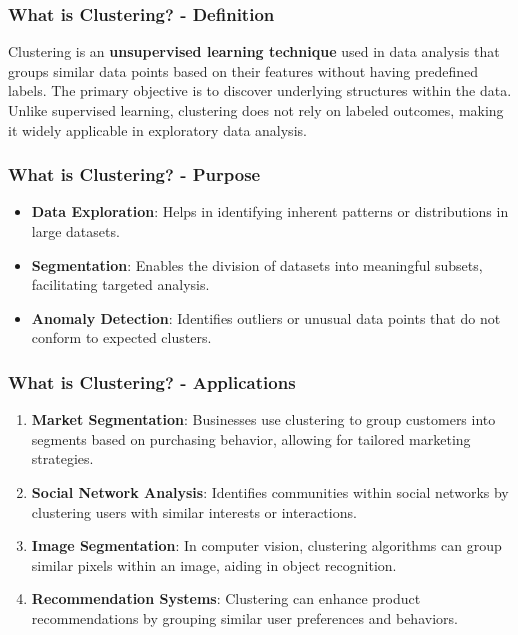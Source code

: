 \documentclass[aspectratio=169]{beamer}
\begin{document}
\begin{frame}[fragile]
    \frametitle{What is Clustering? - Definition}
    Clustering is an \textbf{unsupervised learning technique} used in data analysis that groups similar data points based on their features without having predefined labels. 
    The primary objective is to discover underlying structures within the data. Unlike supervised learning, clustering does not rely on labeled outcomes, making it widely applicable in exploratory data analysis.
\end{frame}

\begin{frame}[fragile]
    \frametitle{What is Clustering? - Purpose}
    \begin{itemize}
        \item \textbf{Data Exploration}: Helps in identifying inherent patterns or distributions in large datasets.
        \item \textbf{Segmentation}: Enables the division of datasets into meaningful subsets, facilitating targeted analysis.
        \item \textbf{Anomaly Detection}: Identifies outliers or unusual data points that do not conform to expected clusters.
    \end{itemize}
\end{frame}

\begin{frame}[fragile]
    \frametitle{What is Clustering? - Applications}
    \begin{enumerate}
        \item \textbf{Market Segmentation}: Businesses use clustering to group customers into segments based on purchasing behavior, allowing for tailored marketing strategies.
        \item \textbf{Social Network Analysis}: Identifies communities within social networks by clustering users with similar interests or interactions.
        \item \textbf{Image Segmentation}: In computer vision, clustering algorithms can group similar pixels within an image, aiding in object recognition.
        \item \textbf{Recommendation Systems}: Clustering can enhance product recommendations by grouping similar user preferences and behaviors.
    \end{enumerate}
\end{frame}
\end{document}
